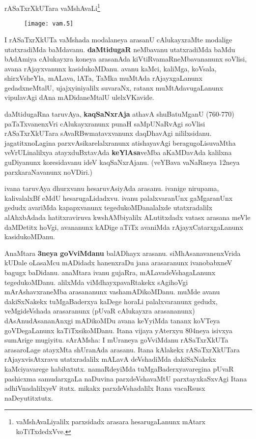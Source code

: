 \documentclass[11pt,a4size]{article}
\begin{document}
\newpage
\centerline{rASaTxrXkUTara vaMshAvaLi\footnote{vaMshAvaLiyalilx parxsidadx arasara hesarugaLanunx
  mAtarx koTiTxdedxVve.}}
\bigskip
\begin{figure}[H]
\centering
\texttt{[image: vam.5]} 
\end{figure}




I rASaTxrXkUTa vaMshada modalaneya arasanU cAlukayxraMte modalige
utatxradiMda baMdavanu. \textbf{daMtidugaR} neMbavanu utatxradiMda
baMdu bAdAmiya cAlukayxra koneya arasanAda kiVtiRvamaRneMbavananunx
soVlisi, avana rAjayxvanunx kasidukoMDanu. avanu kaMci, kaliMga,
koVsala, shirxVsheYla, mALava, lATa, TaMka muMtAda rAjayxgaLanunx
gedadxneMtalU, ujajxyiniyalilx suvaraNx, ratanx muMtAdavugaLanunx
vipulavAgi dAna mADidaneMtalU ulelxVKavide.

daMtidugaRna taruvAya, \textbf{kaqSaNxrAja} athavA shuBatuMganU
(760-770) paTaTxvanenxVri cAlukayxranunx punaH saMpUNaRvAgi soVlisi
rASaTxrXkUTara sAvaRBwmatavxvanunx daqDhavAgi
nililxsidanu. jagatitxnoLagina parxvAsikarelalxranunx atishayavAgi
beragugoLisuvaMtha veVrULinalilxya atayxduBxtavAda
\textbf{keYlAsa}veMba aKaMDavAda kalilxna guDiyanunx koresidavanu ideV
kaqSaNxrAjanu. (veYBava vaNaRneya 12neya parxkaraNavanunx noVDiri.)

ivana taruvAya dhurxvanu hesaruvAsiyAda arasanu. ivanige nirupama,
kalivalalxBf eMdU hesarugaLidadxvu. ivanu palalxvaranUnx gaMgaranUnx
gedudx avariMda kapapxvanunx tegedukoMDanalalxde utatxradalilx
alAhxbAdada hatitxraviruva kwshAMbiyalilx ALutitxdadx vatasx arasana
meVle daMDetitx hoVgi, avananunx kADige aTiTx avaniMda
rAjayxCatarxgaLanunx kasidukoMDanu.

AnaMtara \textbf{3neya goVviMdanu} balADhayx
arasanu. siMhAsanavanenxVrida kUDale oLasaMcu mADidadx hanenxraDu jana
arasaranunx ivanobabxneV bagugx baDidanu. anaMtara ivanu gujaRra,
mALavadeVshagaLanunx tegedukoMDanu. alilxMda viMdhayxpavaRtakekx
sAgihoVgi mArAshavxraneMba arasananunx vashamADikoMDanu. muMde avanu
dakiSxNakekx tuMgaBaderxya kaDege horaLi palalxvaranunx gedudx,
veMgideVshada arasaranunx (pUvaR cAlukayxra arasananunx)
dAsAnudAsananAnxgi mADikoMDu avana keYyiMda tananx koVTeya
goVDegaLanunx kaTiTxsikoMDanu. Itana vijaya yAterxyu 804neya isivxya
sumArige mugiyitu. sArAMsha: I mUraneya goVviMdanu rASaTxrXkUTa
arasaroLage atayxMta shUranAda arasanu. Itana kAlakekx rASaTxrXkUTara
rAjayxvisAtxravu utatxradalilx mALavA deVshadiMda dakiSxNakekx
kaMciyavarege habibxtutx. namaRdeyiMda tuMgaBaderxyavaregina pUvaR
pashicxma samudarxgaLa naDuvina parxdeVshavaMtU parxtayxkaSxvAgi Itana
adhiVnadalilxyeV itutx. mikakx parxdeVshadalilx Itana vacaRsusx
naDeyutitxtutx.
\end{document}
